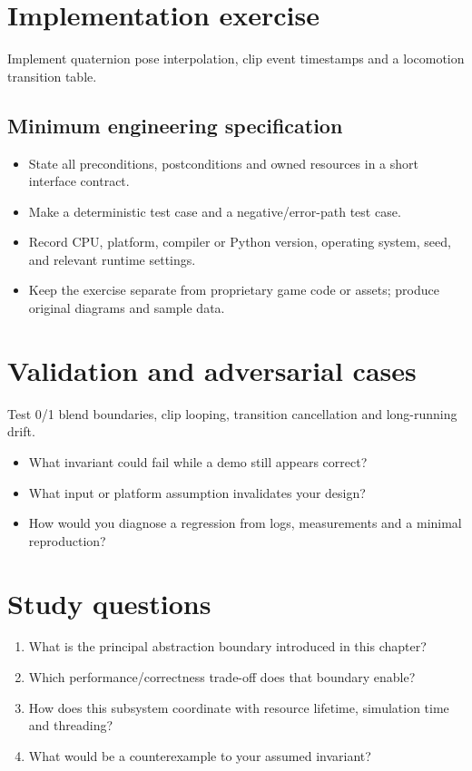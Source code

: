 \documentclass[11pt,letterpaper]{article}
\begin{document}
\section{Implementation exercise}
Implement quaternion pose interpolation, clip event timestamps and a locomotion transition table.

\subsection{Minimum engineering specification}
\begin{itemize}
\item State all preconditions, postconditions and owned resources in a short interface contract.
\item Make a deterministic test case and a negative/error-path test case.
\item Record CPU, platform, compiler or Python version, operating system, seed, and relevant runtime settings.
\item Keep the exercise separate from proprietary game code or assets; produce original diagrams and sample data.
\end{itemize}
\section{Validation and adversarial cases}
Test 0/1 blend boundaries, clip looping, transition cancellation and long-running drift.

\begin{itemize}
\item What invariant could fail while a demo still appears correct?
\item What input or platform assumption invalidates your design?
\item How would you diagnose a regression from logs, measurements and a minimal reproduction?
\end{itemize}
\section{Study questions}
\begin{enumerate}
\item What is the principal abstraction boundary introduced in this chapter?
\item Which performance/correctness trade-off does that boundary enable?
\item How does this subsystem coordinate with resource lifetime, simulation time and threading?
\item What would be a counterexample to your assumed invariant?
\end{enumerate}
\end{document}
